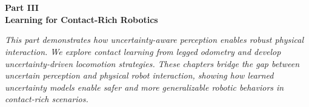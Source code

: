 \chapter*{} %
\begin{center}
    \vspace*{3.5cm} 
{\Huge \textbf{Part III} \\ [1cm]}
{\LARGE \textbf{Learning for Contact-Rich Robotics}}
\end{center}

\vspace{2cm}

\begin{center}
\textit{This part demonstrates how uncertainty-aware perception enables robust physical interaction. We explore contact learning from legged odometry and develop uncertainty-driven locomotion strategies. These chapters bridge the gap between uncertain perception and physical robot interaction, showing how learned uncertainty models enable safer and more generalizable robotic behaviors in contact-rich scenarios.}
\end{center}
